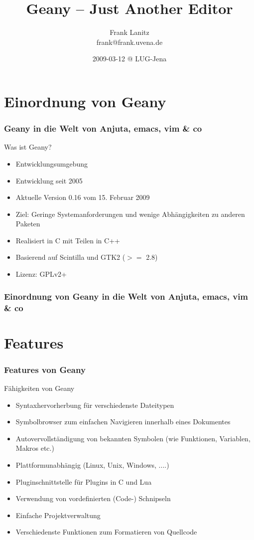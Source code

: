 \documentclass[compress]{beamer}
\title{Geany -- Just Another Editor}
\author{Frank Lanitz \\ frank@frank.uvena.de}
\date{2009-03-12 @ LUG-Jena}
\begin{document}
\frame{\titlepage}
\frame{\tableofcontents}

\section{Einordnung von Geany}
\begin{frame}
	\frametitle{Geany in die Welt von Anjuta, emacs, vim \& co}
	\begin{block}{Was ist Geany?}
		\begin{itemize}
			\item Entwicklungsumgebung
			\item Entwicklung seit 2005
			\item Aktuelle Version 0.16 vom 15. Februar 2009
			\item Ziel: Geringe Systemanforderungen und wenige
				  Abhängigkeiten zu anderen Paketen
			\item Realisiert in C mit Teilen in C++
			\item Basierend auf Scintilla und GTK2 ($>=$ 2.8)
			\item Lizenz: GPLv2+
		\end{itemize}
	\end{block}
\end{frame}

\begin{frame}
	\frametitle{Einordnung von Geany in die Welt von Anjuta, emacs, vim \& co}
	\begin{figure}[ht]
		\centering
 		\footnotesize
		
	\end{figure}
\end{frame}


\section{Features}
\begin{frame}[allowframebreak]
	\frametitle{Features von Geany}
	\begin{block}{Fähigkeiten von Geany}
		\begin{itemize}
			\item Syntaxhervorherbung für verschiedenste Dateitypen
			\item Symbolbrowser zum einfachen Navigieren innerhalb
			      eines Dokumentes
			\item Autovervollständigung von bekannten Symbolen (wie
				  Funktionen, Variablen, Makros etc.)
			\item Plattformunabhängig (Linux, Unix, Windows, ....)
			\item Pluginschnittstelle für Plugins in C und Lua
			\item Verwendung von vordefinierten (Code-) Schnipseln
			\item Einfache Projektverwaltung
			\item Verschiedenste Funktionen zum Formatieren von Quellcode
		\end{itemize}
	\end{block}
\end{frame}
\end{document}
